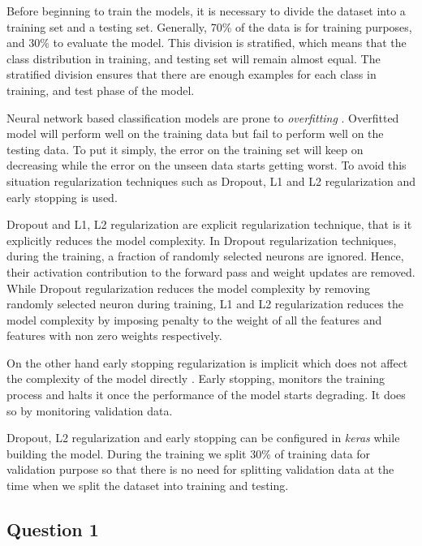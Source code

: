 Before beginning to train the models, it is necessary to divide the dataset into a training set and a testing set. Generally, 70\% of the data is for training purposes, and 30\% to evaluate the model. This division is stratified, which means that the class distribution in training, and testing set will remain almost equal. The stratified division ensures that there are enough examples for each class in training, and test phase of the model. 

Neural network based classification models are prone to \textit{overfitting} \cite{Prechelt1998}. Overfitted model will perform well on the training data but fail to perform well on the testing data. To put it simply, the error on the training set will keep on decreasing while the error on the unseen data starts getting worst. To avoid this situation regularization techniques such as Dropout, L1 and L2 regularization and early stopping is used.

Dropout and L1, L2 regularization are explicit regularization technique, that is it explicitly reduces the model complexity. In Dropout regularization techniques, during the training, a fraction of randomly selected neurons are ignored. Hence, their activation contribution to the forward pass and weight updates are removed. While Dropout regularization reduces the model complexity by removing randomly selected neuron during training, L1 and L2 regularization reduces the model complexity by imposing penalty to the weight of all the features and features with non zero weights respectively.      

On the other hand early stopping regularization is implicit which does not affect the complexity of the model directly \cite{zhang2016understanding}. Early stopping, monitors the training process and halts it once the performance of the model starts degrading. It does so by monitoring validation data. 


Dropout, L2 regularization and early stopping can be configured in \textit{keras} while building the model. During the training we split 30\% of training data for validation purpose so that there is no need for splitting validation data at the time when we split the dataset into training and testing.

\subsection{Question 1} \label{impQuestion1}


